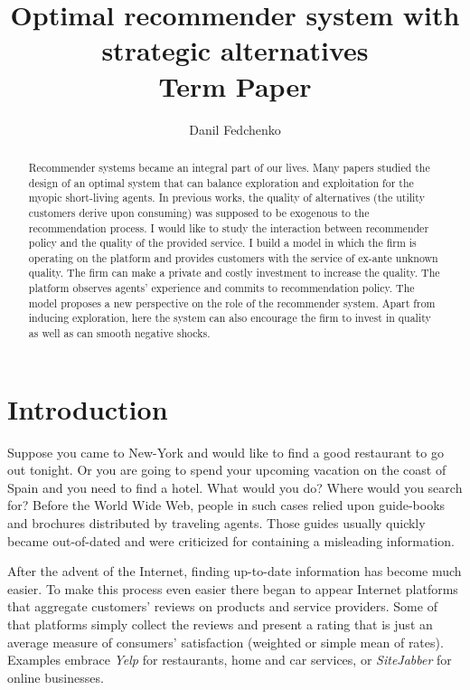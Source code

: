 \documentclass[a4paper]{article}
\title{Optimal recommender system with strategic alternatives \\ Term Paper}
\date{}
\author{Danil Fedchenko}
\begin{document}
	\maketitle
	\begin{abstract}
		Recommender systems became an integral part of our lives. Many papers studied the design of an optimal system that can balance exploration and exploitation for the myopic short-living agents. In previous works, the quality of alternatives (the utility customers derive upon consuming) was supposed to be exogenous to the recommendation process. I would like to study the interaction between recommender policy and the quality of the provided service. I build a model in which the firm is operating on the platform and provides customers with the service of ex-ante unknown quality. The firm can make a private and costly investment to increase the quality. The platform observes agents’ experience and commits to recommendation policy. The model proposes a new perspective on the role of the recommender system. Apart from inducing exploration, here the system can also encourage the firm to invest in quality as well as can smooth negative shocks.
	\end{abstract}
	\newpage
	\section{Introduction}
	Suppose you came to New-York and would like to find a good restaurant to go out tonight. Or you are going to spend your upcoming vacation on the coast of Spain and you need to find a hotel. What would you do? Where would you search for?  Before the World Wide Web, people in such cases relied upon guide-books and brochures distributed by traveling agents. Those guides usually quickly became out-of-dated and were criticized for containing a misleading information. 
	
	
	
	
	
	After the advent of the Internet, finding up-to-date information has become much easier. To make this process even easier there began to appear Internet platforms that aggregate customers' reviews on products and service providers. Some of that platforms simply collect the reviews and present a rating that is just an average measure of consumers' satisfaction (weighted or simple mean of rates). Examples embrace \textit{Yelp} for restaurants, home and car services, or \textit{SiteJabber} for online businesses.
	
	
	
\end{document}
